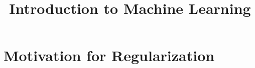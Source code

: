 



\newcommand{\titlefigure}{figure_man/biasvariance_scheme.png}
\newcommand{\learninggoals}{
  \item \textcolor{blue}{XXX}
  \item \textcolor{blue}{XXX}
}

\title{Introduction to Machine Learning}
\date{}




\section{Motivation for Regularization}


